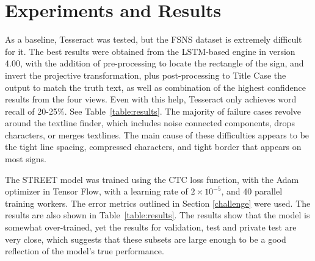 \documentclass[runningheads]{llncs}
\begin{document}
\section{Experiments and Results}
As a baseline, Tesseract \cite{tutorial} was tested, but the FSNS dataset is extremely difficult for it.
 The best results were obtained from the LSTM-based engine in version 4.00, with the addition of
pre-processing to locate the rectangle of the sign, and invert the projective transformation, plus
post-processing to Title Case the output to match the truth text, as well as combination of the highest confidence
results from the four views.
Even with this help, Tesseract only achieves word recall of 20-25\%. See Table~\ref{table:results}.
The majority of failure cases revolve around the textline finder, which includes noise connected components,
 drops characters, or merges textlines. The main cause of these difficulties appears to be the tight line spacing,
compressed characters, and tight border that appears on most signs.

The STREET model was trained using the CTC \cite{graves2006connectionist} loss function,
 with the Adam optimizer \cite{kingma2014adam} in Tensor Flow,
 with a learning rate of $2\times10^{-5}$, and 40 parallel training workers.
The error metrics outlined in Section \ref{challenge} were used.
The results are also shown in
 Table~\ref{table:results}.
 The results show that the model is somewhat over-trained, yet the results for validation, test and private test are very
 close, which suggests that these subsets are large enough to be a good reflection of the model's true
 performance.
\end{document}
